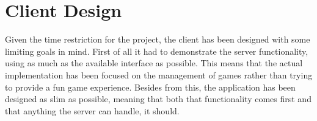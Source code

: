 \section{Client Design}\label{sec:desClient}
Given the time restriction for the project, the client has been designed with some limiting goals in mind. First of all it had to demonstrate the server functionality, using as much as the available interface as possible. This means that the actual implementation has been focused on the management of games rather than trying to provide a fun game experience. Besides from this, the application has been designed as slim as possible, meaning that both that functionality comes first and that anything the server can handle, it should.


